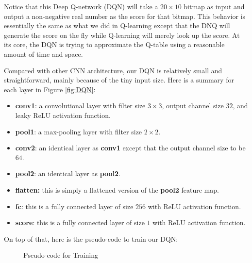 \documentclass[letterpaper]{article} %
\makeatletter
\newcommand{\removelatexerror}{\let\@latex@error\@gobble}
\makeatother
\begin{document}
Notice that this Deep Q-network (DQN) will take a $20\times 10$ bitmap as input and output a non-negative real number as the score for that bitmap. This behavior is essentially the same as what we did in Q-learning except that the DNQ will generate the score on the fly while Q-learning will merely look up the score. At its core, the DQN is trying to approximate the Q-table using a reasonable amount of time and space. 

Compared with other CNN architecture, our DQN is relatively small and straightforward, mainly because of the tiny input size. Here is a summary for each layer in Figure \ref{fig:DQN}:
\begin{itemize}
  \item 
  {\bf conv1}: a convolutional layer with filter size $3\times 3$, output channel size $32$, and leaky ReLU activation function.
  \item 
  {\bf pool1}: a max-pooling layer with filter size $2\times 2$.
  \item 
  {\bf conv2}: an identical layer as {\bf conv1} except that the output channel size to be $64$.
  \item 
  {\bf pool2}: an identical layer as {\bf pool2}.  
  \item 
  {\bf flatten:} this is simply a flattened version of the {\bf pool2} feature map.
  \item 
  {\bf fc}: this is a fully connected layer of size $256$ with ReLU activation function.
  \item 
  {\bf score}: this is a fully connected layer of size $1$ with ReLU activation function.
\end{itemize}

On top of that, here is the pseudo-code to train our DQN:

\begin{figure}[h!]
	\centering
	\begin{minipage}{.95\linewidth}
    \removelatexerror%
		\begin{algorithm}[H]
			\DontPrintSemicolon
		\end{algorithm}
	\end{minipage}
  \caption{Pseudo-code for Training}
  \label{fig:code1}
\end{figure}
\end{document}
